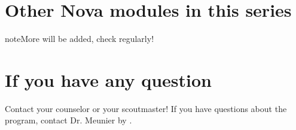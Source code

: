 \documentclass[letterpaper,10pt,english,openany,oneside]{sphinxmanual}
\begin{document}
\section{Other Nova modules in this series}
\label{\detokenize{introduction:other-nova-modules-in-this-series}}
\begin{sphinxadmonition}{note}{More will be added, check regularly!}


\end{sphinxadmonition}


\section{If you have any question}
\label{\detokenize{introduction:if-you-have-any-question}}
Contact your counselor or your scoutmaster! If you have questions about the program, contact Dr. Meunier  by .

\end{document}
